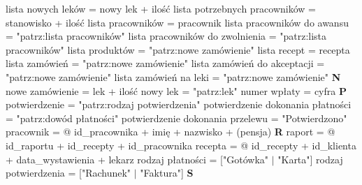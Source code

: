 \documentclass[a4paper, 11pt]{article}
\begin{document}
	lista nowych leków = nowy lek + ilość \newline
	lista potrzebnych pracowników = stanowisko + ilość \newline
	lista pracowników = {pracownik} \newline
	lista pracowników do awansu = "patrz:lista pracowników" \newline
	lista pracowników do zwolnienia = "patrz:lista pracowników" \newline
	lista produktów = "patrz:nowe zamówienie" \newline
	lista recept = {recepta} \newline
	lista zamówień = "patrz:nowe zamówienie" \newline
	lista zamówień do akceptacji = "patrz:nowe zamówienie" \newline
	lista zamówień na leki = "patrz:nowe zamówienie" \newline \newline
	\textbf{N} \newline\newline
	\noindent
	nowe zamówienie = lek + ilość \newline
	nowy lek = "patrz:lek" \newline
	numer wpłaty = {cyfra} \newline \newline
	\textbf{P} \newline \newline
	\noindent
	potwierdzenie = "patrz:rodzaj potwierdzenia" \newline
	potwierdzenie dokonania płatności = "patrz:dowód płatności" \newline
	potwierdzenie dokonania przelewu = "Potwierdzono" \newline
	pracownik = @ id\_pracownika + imię + nazwisko + (pensja) \newline \newline
	\textbf{R} \newline \newline
	\noindent	
	raport = @ id\_raportu + id\_recepty + id\_pracownika \newline
	recepta = @ id\_recepty + id\_klienta + data\_wystawienia + lekarz \newline
	rodzaj płatności = ["Gotówka" $|$ "Karta"] \newline
	rodzaj potwierdzenia = ["Rachunek" $|$ "Faktura"] \newline \newline
	\textbf{S} \newline \newline
\end{document}
